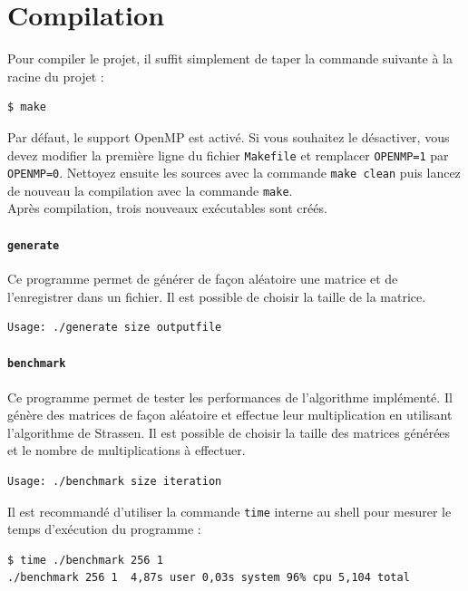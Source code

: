 \documentclass[a4paper, 12pt]{article}
\begin{document}
\section{Compilation}

Pour compiler le projet, il suffit simplement de taper la commande
suivante à la racine du projet :

\begin{lstlisting}
$ make
\end{lstlisting}

Par défaut, le support OpenMP est activé. Si vous souhaitez le
désactiver, vous devez modifier la première ligne du fichier
\texttt{Makefile} et remplacer \texttt{OPENMP=1} par
\texttt{OPENMP=0}. Nettoyez ensuite les sources avec la commande
\texttt{make clean} puis lancez de nouveau la compilation avec la
commande \texttt{make}. \\

Après compilation, trois nouveaux exécutables sont créés.

\paragraph{\texttt{generate}}

Ce programme permet de générer de façon aléatoire une matrice et de
l'enregistrer dans un fichier. Il est possible de choisir la taille de
la matrice.

\begin{lstlisting}
Usage: ./generate size outputfile
\end{lstlisting}

\paragraph{\texttt{benchmark}}

Ce programme permet de tester les performances de l'algorithme
implémenté. Il génère des matrices de façon aléatoire et effectue leur
multiplication en utilisant l'algorithme de Strassen. Il est possible
de choisir la taille des matrices générées et le nombre de
multiplications à effectuer.

\begin{lstlisting}
Usage: ./benchmark size iteration
\end{lstlisting}

Il est recommandé d'utiliser la commande \texttt{time} interne au
shell pour mesurer le temps d'exécution du programme :

\begin{lstlisting}
$ time ./benchmark 256 1
./benchmark 256 1  4,87s user 0,03s system 96% cpu 5,104 total
\end{lstlisting}
\end{document}
